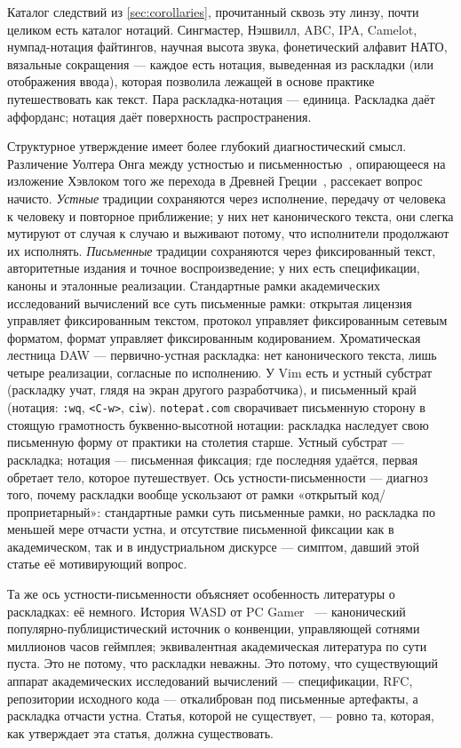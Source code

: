 \documentclass[10pt,letterpaper,twocolumn]{article}
\begin{document}
Каталог следствий из \textsection\ref{sec:corollaries}, прочитанный сквозь эту линзу, почти целиком есть каталог нотаций. Сингмастер, Нэшвилл, ABC, IPA, Camelot, нумпад-нотация файтингов, научная высота звука, фонетический алфавит НАТО, вязальные сокращения --- каждое есть нотация, выведенная из раскладки (или отображения ввода), которая позволила лежащей в основе практике путешествовать как текст. Пара раскладка-нотация --- единица. Раскладка даёт аффорданс; нотация даёт поверхность распространения.

Структурное утверждение имеет более глубокий диагностический смысл. Различение Уолтера Онга между устностью и письменностью~\citep{ong1982orality}, опирающееся на изложение Хэвлоком того же перехода в Древней Греции~\citep{havelock1963preface}, рассекает вопрос начисто. \emph{Устные} традиции сохраняются через исполнение, передачу от человека к человеку и повторное приближение; у них нет канонического текста, они слегка мутируют от случая к случаю и выживают потому, что исполнители продолжают их исполнять. \emph{Письменные} традиции сохраняются через фиксированный текст, авторитетные издания и точное воспроизведение; у них есть спецификации, каноны и эталонные реализации. Стандартные рамки академических исследований вычислений все суть письменные рамки: открытая лицензия управляет фиксированным текстом, протокол управляет фиксированным сетевым форматом, формат управляет фиксированным кодированием. Хроматическая лестница DAW --- первично-устная раскладка: нет канонического текста, лишь четыре реализации, согласные по исполнению. У Vim есть и устный субстрат (раскладку учат, глядя на экран другого разработчика), и письменный край (нотация: \texttt{:wq}, \texttt{<C-w>}, \texttt{ciw}). \texttt{notepat.com} сворачивает письменную сторону в стоящую грамотность буквенно-высотной нотации: раскладка наследует свою письменную форму от практики на столетия старше. Устный субстрат --- раскладка; нотация --- письменная фиксация; где последняя удаётся, первая обретает тело, которое путешествует. Ось устности-письменности --- диагноз того, почему раскладки вообще ускользают от рамки «открытый код/проприетарный»: стандартные рамки суть письменные рамки, но раскладка по меньшей мере отчасти устна, и отсутствие письменной фиксации как в академическом, так и в индустриальном дискурсе --- симптом, давший этой статье её мотивирующий вопрос.

Та же ось устности-письменности объясняет особенность литературы о раскладках: её немного. История WASD от PC Gamer~\citep{fenlon2016wasd} --- канонический популярно-публицистический источник о конвенции, управляющей сотнями миллионов часов геймплея; эквивалентная академическая литература по сути пуста. Это не потому, что раскладки неважны. Это потому, что существующий аппарат академических исследований вычислений --- спецификации, RFC, репозитории исходного кода --- откалиброван под письменные артефакты, а раскладка отчасти устна. Статья, которой не существует, --- ровно та, которая, как утверждает эта статья, должна существовать.
\end{document}
